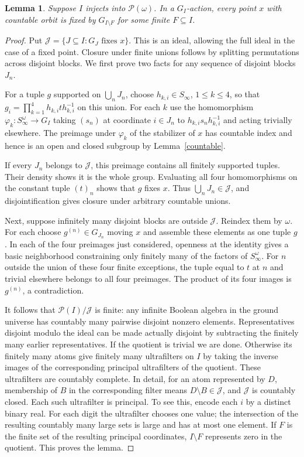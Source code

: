 \documentclass[11pt]{article}
\newtheorem{lemma}[theorem]{Lemma}
\newcommand{\Sinf}{S_\infty}
\begin{document}
\begin{lemma}\label{rows}
Suppose $I$ injects into $\mathcal P(\omega)$. In a $G_I$-action, every point $x$ with countable orbit is fixed by $G_{I\setminus F}$ for some finite $F\subseteq I$.
\end{lemma}
\begin{proof}
Put $\mathcal J=\{J\subseteq I:G_J\text{ fixes }x\}$. This is an ideal, allowing the full ideal in the case of a fixed point. Closure under finite unions follows by splitting permutations across disjoint blocks. We first prove two facts for any sequence of disjoint blocks $J_n$.

For a tuple $g$ supported on $\bigcup_nJ_n$, choose $h_{k,i}\in\Sinf$, $1\le k\le4$, so that $g_i=\prod_{k=1}^4 h_{k,i}t h_{k,i}^{-1}$ on this union. For each $k$ use the homomorphism $\varphi_k:\Sinf^\omega\longrightarrow G_I$ taking $(s_n)$ at coordinate $i\in J_n$ to $h_{k,i}s_n h_{k,i}^{-1}$ and acting trivially elsewhere. The preimage under $\varphi_k$ of the stabilizer of $x$ has countable index and hence is an open and closed subgroup by Lemma~\ref{countable}.

If every $J_n$ belongs to $\mathcal J$, this preimage contains all finitely supported tuples. Their density shows it is the whole group. Evaluating all four homomorphisms on the constant tuple $(t)_n$ shows that $g$ fixes $x$. Thus $\bigcup_nJ_n\in\mathcal J$, and disjointification gives closure under arbitrary countable unions.

Next, suppose infinitely many disjoint blocks are outside $\mathcal J$. Reindex them by $\omega$. For each choose $g^{(n)}\in G_{J_n}$ moving $x$ and assemble these elements as one tuple $g$. In each of the four preimages just considered, openness at the identity gives a basic neighborhood constraining only finitely many of the factors of $\Sinf^\omega$. For $n$ outside the union of these four finite exceptions, the tuple equal to $t$ at $n$ and trivial elsewhere belongs to all four preimages. The product of its four images is $g^{(n)}$, a contradiction.

It follows that $\mathcal P(I)/\mathcal J$ is finite: any infinite Boolean algebra in the ground universe has countably many pairwise disjoint nonzero elements. Representatives disjoint modulo the ideal can be made actually disjoint by subtracting the finitely many earlier representatives. If the quotient is trivial we are done. Otherwise its finitely many atoms give finitely many ultrafilters on $I$ by taking the inverse images of the corresponding principal ultrafilters of the quotient. These ultrafilters are countably complete. In detail, for an atom represented by $D$, membership of $B$ in the corresponding filter means $D\setminus B\in\mathcal J$, and $\mathcal J$ is countably closed. Each such ultrafilter is principal. To see this, encode each $i$ by a distinct binary real. For each digit the ultrafilter chooses one value; the intersection of the resulting countably many large sets is large and has at most one element. If $F$ is the finite set of the resulting principal coordinates, $I\setminus F$ represents zero in the quotient. This proves the lemma.
\end{proof}
\end{document}
